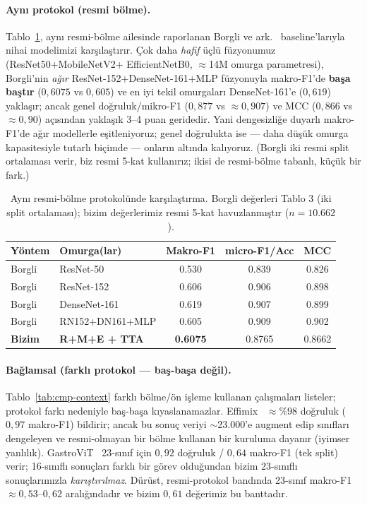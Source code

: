 \paragraph{Aynı protokol (resmi bölme).}
Tablo~\ref{tab:cmp-borgli}, aynı resmi-bölme ailesinde raporlanan Borgli ve
ark.~\cite{borgli2020hyperkvasir} baseline'larıyla nihai modelimizi
karşılaştırır. Çok daha \emph{hafif} üçlü füzyonumuz (ResNet50+MobileNetV2+
EfficientNetB0, $\approx$14M omurga parametresi), Borgli'nin \emph{ağır}
ResNet-152+DenseNet-161+MLP füzyonuyla makro-F1'de \textbf{başa baştır}
($0{,}6075$ vs $0{,}605$) ve en iyi tekil omurgaları DenseNet-161'e ($0{,}619$)
yaklaşır; ancak genel doğruluk/mikro-F1 ($0{,}877$ vs $\approx 0{,}907$) ve MCC
($0{,}866$ vs $\approx 0{,}90$) açısından yaklaşık 3--4 puan geridedir. Yani
dengesizliğe duyarlı makro-F1'de ağır modellerle eşitleniyoruz; genel doğrulukta
ise --- daha düşük omurga kapasitesiyle tutarlı biçimde --- onların altında
kalıyoruz. (Borgli iki resmi split ortalaması verir, biz resmi 5-kat kullanırız;
ikisi de resmi-bölme tabanlı, küçük bir fark.)

\begin{table}[H]
\centering
\caption{Aynı resmi-bölme protokolünde karşılaştırma. Borgli değerleri
\cite{borgli2020hyperkvasir} Tablo 3 (iki split ortalaması); bizim değerlerimiz
resmi 5-kat havuzlanmıştır ($n=10{.}662$).}
\label{tab:cmp-borgli}
\begin{tabular}{ll ccc}
\toprule
Yöntem & Omurga(lar) & Makro-F1 & micro-F1/Acc & MCC \\
\midrule
Borgli & ResNet-50 & 0.530 & 0.839 & 0.826 \\
Borgli & ResNet-152 & 0.606 & 0.906 & 0.898 \\
Borgli & DenseNet-161 & 0.619 & 0.907 & 0.899 \\
Borgli & RN152+DN161+MLP & 0.605 & 0.909 & 0.902 \\
\textbf{Bizim} & \textbf{R+M+E + TTA} & \textbf{0.6075} & 0.8765 & 0.8662 \\
\bottomrule
\end{tabular}
\end{table}

\paragraph{Bağlamsal (farklı protokol --- baş-başa değil).}
Tablo~\ref{tab:cmp-context} farklı bölme/ön işleme kullanan çalışmaları listeler;
protokol farkı nedeniyle baş-başa kıyaslanamazlar. Effimix~\cite{ramamurthy2022effimix}
$\approx \%98$ doğruluk ($0{,}97$ makro-F1) bildirir; ancak bu sonuç veriyi
$\sim$23.000'e augment edip sınıfları dengeleyen ve resmi-olmayan bir bölme
kullanan bir kuruluma dayanır (iyimser yanlılık). GastroViT~\cite{gastrovit2025}
23-sınıf için $0{,}92$ doğruluk / $0{,}64$ makro-F1 (tek split) verir; 16-sınıflı
sonuçları farklı bir görev olduğundan bizim 23-sınıflı sonuçlarımızla
\emph{karıştırılmaz}. Dürüst, resmi-protokol bandında 23-sınıf makro-F1
$\approx 0{,}53$--$0{,}62$ aralığındadır ve bizim $0{,}61$ değerimiz bu banttadır.

